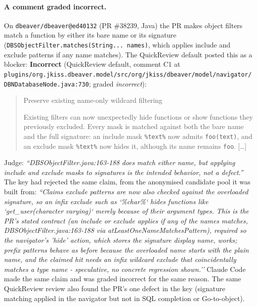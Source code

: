 \documentclass[11pt,a4paper]{article}
\newcommand{\qcr}{QuickReview}
\newcommand{\code}[1]{\texttt{#1}}
\begin{document}
\paragraph{A comment graded incorrect.} On \code{dbeaver/\allowbreak{}dbeaver@ed40132}
(PR \#38239, Java) the PR makes object filters match a function by either its
bare name or its signature (\code{DBSObjectFilter.matches(String... names)},
which applies include and exclude patterns if any name matches). The \qcr{}
default posted this as a blocker:
\noindent\textbf{Incorrect} (QuickReview default, comment C1 at \code{plugins/\allowbreak{}org.jkiss.dbeaver.model/\allowbreak{}src/\allowbreak{}org/\allowbreak{}jkiss/\allowbreak{}dbeaver/\allowbreak{}model/\allowbreak{}navigator/\allowbreak{}DBNDatabaseNode.java:730}; graded \emph{incorrect}):
\begin{quote}\small
Preserve existing name-only wildcard filtering\par Existing filters can now unexpectedly hide functions or show functions they previously excluded. Every mask is matched against both the bare name and the full signature: an include mask \texttt{\%text\%} now admits \texttt{foo(text)}, and an exclude mask \texttt{\%text\%} now hides it, although its name remains \texttt{foo}. [\ldots]
\end{quote}
\noindent Judge: \emph{``DBSObjectFilter.java:163-188 does match either name, but applying include and exclude masks to signatures is the intended behavior, not a defect.''} The key had rejected the same claim, from the anonymised candidate pool it was built from: \emph{``Claims exclude patterns are now also checked against the overloaded signature, so an infix exclude such as `\%char\%` hides functions like `get\_user(character varying)` merely because of their argument types. This is the PR's stated contract (an include or exclude applies if any of the names matches, DBSObjectFilter.java:163-188 via atLeastOneNameMatchesPattern), required so the navigator's 'hide' action, which stores the signature display name, works; prefix patterns behave as before because the overloaded name starts with the plain name, and the claimed hit needs an infix wildcard exclude that coincidentally matches a type name - speculative, no concrete regression shown.''}
Claude Code made the same claim and was graded incorrect for the same reason. The same \qcr{} review also found the PR's one defect in the key (signature matching applied in the navigator but not in SQL completion or Go-to-object).
\end{document}
